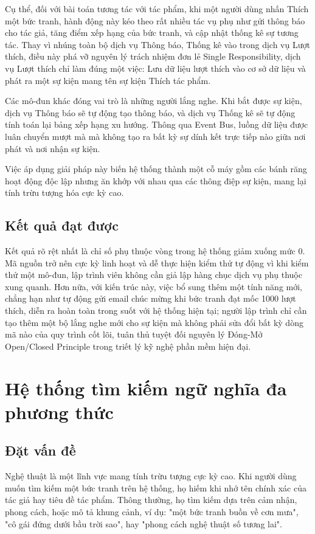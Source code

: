 Cụ thể, đối với bài toán tương tác với tác phẩm, khi một người dùng nhấn Thích một bức tranh, hành động này kéo theo rất nhiều tác vụ phụ như gửi thông báo cho tác giả, tăng điểm xếp hạng của bức tranh, và cập nhật thống kê sự tương tác. Thay vì nhúng toàn bộ dịch vụ Thông báo, Thống kê vào trong dịch vụ Lượt thích, điều này phá vỡ nguyên lý trách nhiệm đơn lẻ Single Responsibility, dịch vụ Lượt thích chỉ làm đúng một việc: Lưu dữ liệu lượt thích vào cơ sở dữ liệu và phát ra một sự kiện mang tên sự kiện Thích tác phẩm.

Các mô-đun khác đóng vai trò là những người lắng nghe. Khi bắt được sự kiện, dịch vụ Thông báo sẽ tự động tạo thông báo, và dịch vụ Thống kê sẽ tự động tính toán lại bảng xếp hạng xu hướng. Thông qua Event Bus, luồng dữ liệu được luân chuyển mượt mà mà không tạo ra bất kỳ sự dính kết trực tiếp nào giữa nơi phát và nơi nhận sự kiện.

Việc áp dụng giải pháp này biến hệ thống thành một cỗ máy gồm các bánh răng hoạt động độc lập nhưng ăn khớp với nhau qua các thông điệp sự kiện, mang lại tính trừu tượng hóa cực kỳ cao.

\subsection{Kết quả đạt được}
Kết quả rõ rệt nhất là chỉ số phụ thuộc vòng trong hệ thống giảm xuống mức 0. Mã nguồn trở nên cực kỳ linh hoạt và dễ thực hiện kiểm thử tự động vì khi kiểm thử một mô-đun, lập trình viên không cần giả lập hàng chục dịch vụ phụ thuộc xung quanh. Hơn nữa, với kiến trúc này, việc bổ sung thêm một tính năng mới, chẳng hạn như tự động gửi email chúc mừng khi bức tranh đạt mốc 1000 lượt thích, diễn ra hoàn toàn trong suốt với hệ thống hiện tại; người lập trình chỉ cần tạo thêm một bộ lắng nghe mới cho sự kiện mà không phải sửa đổi bất kỳ dòng mã nào của quy trình cốt lõi, tuân thủ tuyệt đối nguyên lý Đóng-Mở Open/Closed Principle trong triết lý kỹ nghệ phần mềm hiện đại.


\section{Hệ thống tìm kiếm ngữ nghĩa đa phương thức}

\subsection{Đặt vấn đề}
Nghệ thuật là một lĩnh vực mang tính trừu tượng cực kỳ cao. Khi người dùng muốn tìm kiếm một bức tranh trên hệ thống, họ hiếm khi nhớ tên chính xác của tác giả hay tiêu đề tác phẩm. Thông thường, họ tìm kiếm dựa trên cảm nhận, phong cách, hoặc mô tả khung cảnh, ví dụ: "một bức tranh buồn về cơn mưa", "cô gái đứng dưới bầu trời sao", hay "phong cách nghệ thuật số tương lai". 

